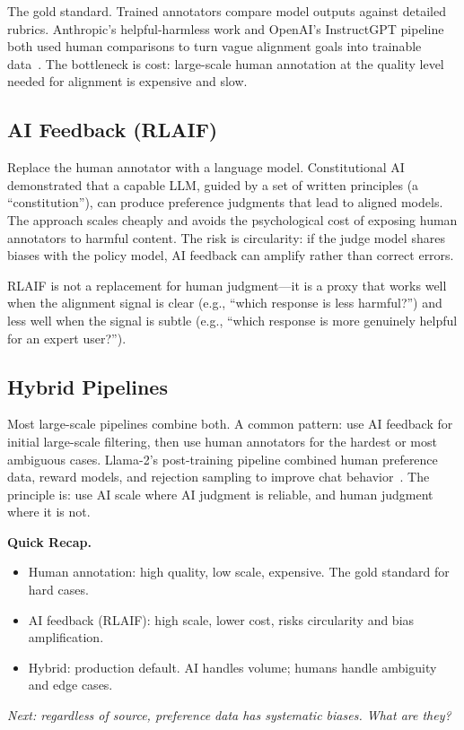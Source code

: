 The gold standard. Trained annotators compare model outputs against detailed rubrics. Anthropic's helpful-harmless work and OpenAI's InstructGPT pipeline both used human comparisons to turn vague alignment goals into trainable data~\cite{bai2022constitutional,ouyang2022instructgpt}. The bottleneck is cost: large-scale human annotation at the quality level needed for alignment is expensive and slow.

\subsection{AI Feedback (RLAIF)}

Replace the human annotator with a language model. Constitutional AI~\cite{bai2022constitutional} demonstrated that a capable LLM, guided by a set of written principles (a ``constitution''), can produce preference judgments that lead to aligned models. The approach scales cheaply and avoids the psychological cost of exposing human annotators to harmful content. The risk is circularity: if the judge model shares biases with the policy model, AI feedback can amplify rather than correct errors.

RLAIF is not a replacement for human judgment---it is a proxy that works well when the alignment signal is clear (e.g., ``which response is less harmful?'') and less well when the signal is subtle (e.g., ``which response is more genuinely helpful for an expert user?'').

\subsection{Hybrid Pipelines}

Most large-scale pipelines combine both. A common pattern: use AI feedback for initial large-scale filtering, then use human annotators for the hardest or most ambiguous cases. Llama-2's post-training pipeline combined human preference data, reward models, and rejection sampling to improve chat behavior~\cite{touvron2023llama2}. The principle is: use AI scale where AI judgment is reliable, and human judgment where it is not.

\begin{quickrecap}
\textbf{Quick Recap.}
\begin{itemize}[nosep,leftmargin=1.5em]
  \item Human annotation: high quality, low scale, expensive. The gold standard for hard cases.
  \item AI feedback (RLAIF): high scale, lower cost, risks circularity and bias amplification.
  \item Hybrid: production default. AI handles volume; humans handle ambiguity and edge cases.
\end{itemize}
\textit{Next: regardless of source, preference data has systematic biases. What are they?}
\end{quickrecap}


